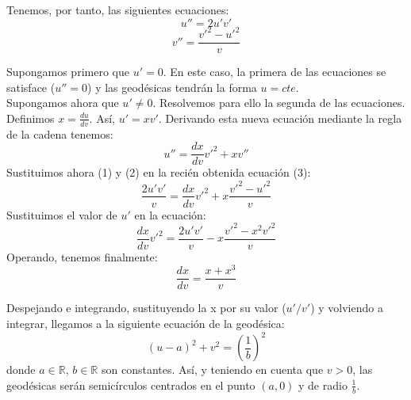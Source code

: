 \documentclass[12pt,a4paper]{article}
\begin{document}
\begin{enumerate}
\begin{itemize}
       Tenemos, por tanto, las siguientes ecuaciones: \\
       \begin{equation}
         u''=2u'v'
       \end{equation}
       \begin{equation}
         v''=\frac{v'^2-u'^2}{v}
       \end{equation}

       Supongamos primero que $u'=0$. En este caso, la primera de las ecuaciones se satisface ($u''=0$) y las geodésicas tendrán la forma $u=cte$. \\

       Supongamos ahora que $u'\neq0$. Resolvemos para ello la segunda de las ecuaciones. Definimos $x=\frac{du}{dv}$. Así, $u'=xv'$. Derivando esta nueva ecuación mediante la regla de la cadena tenemos:
       \begin{equation}
         u''=\frac{dx}{dv}v'^2+xv''
       \end{equation}
       Sustituimos ahora (1) y (2) en la recién obtenida ecuación (3): \\
       \begin{equation*}
         \frac{2u'v'}{v}=\frac{dx}{dv}v'^2+x\frac{v'^2-u'^2}{v} 
       \end{equation*}
       Sustituimos el valor de $u'$ en la ecuación:
       \begin{equation*}
         \frac{dx}{dv}v'^2=\frac{2u'v'}{v}-x\frac{v'^2-x^2v'^2}{v}
       \end{equation*}
       Operando, tenemos finalmente:
       \begin{equation*}
         \frac{dx}{dv}=\frac{x+x^3}{v}
       \end{equation*}

       Despejando e integrando, sustituyendo la x por su valor ($u'/v'$) y volviendo a integrar, llegamos a la siguiente ecuación de la geodésica:
       \begin{equation*}
         (u-a)^2+v^2=(\frac{1}{b})^2
       \end{equation*}
       donde $a\in\mathbb{R}$, $b\in\mathbb{R}$ son constantes. Así, y teniendo en cuenta que $v>0$, las geodésicas serán semicírculos centrados en el punto $(a,0)$ y de radio $\frac{1}{b}$.
  \end{itemize}

\end{enumerate}
\end{document}
